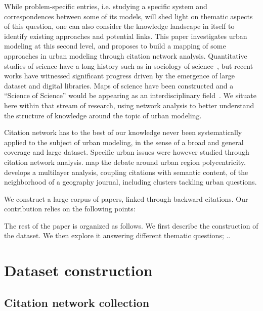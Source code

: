 While problem-specific entries, i.e. studying a specific system and correspondences between some of its models, will shed light on thematic aspects of this question, one can also consider the knowledge landscape in itself to identify existing approaches and potential links. This paper investigates urban modeling at this second level, and proposes to build a mapping of some approaches in urban modeling through citation network analysis. Quantitative studies of science have a long history such as in sociology of science~\cite{barnes1982science}, but recent works have witnessed significant progress driven by the emergence of large dataset and digital libraries. Maps of science have been constructed \cite{boyack2005mapping} and a ``Science of Science'' would be appearing as an interdisciplinary field~\cite{fortunato2018science}. We situate here within that stream of research, using network analysis to better understand the structure of knowledge around the topic of urban modeling.


Citation network has to the best of our knowledge never been systematically applied to the subject of urban modeling, in the sense of a broad and general coverage and large dataset. Specific urban issues were however studied through citation network analysis. \cite{van2016pacifying} map the debate around urban region polycentricity. \cite{raimbault2019exploration} develops a multilayer analysis, coupling citations with semantic content, of the neighborhood of a geography journal, including clusters tackling urban questions. 


We construct a large corpus of papers, linked through backward citations.
Our contribution relies on the following points: 


The rest of the paper is organized as follows. We first describe the construction of the dataset. We then explore it answering different thematic questions; ..


\section*{Dataset construction}

\subsection*{Citation network collection}

